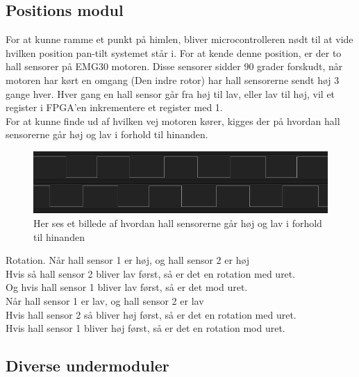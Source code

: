 \subsection{Positions modul}

For at kunne ramme et punkt på himlen, bliver microcontrolleren nødt til at vide hvilken position pan-tilt systemet står i.
For at kende denne position, er der to hall sensorer på EMG30 motoren.
Disse sensorer sidder 90 grader forskudt, når motoren har kørt en omgang (Den indre rotor) har hall sensorerne sendt høj 3 gange hver.
Hver gang en hall sensor går fra høj til lav, eller lav til høj, vil et register i FPGA'en inkrementere et register med 1.\\

For at kunne finde ud af hvilken vej motoren kører, kigges der på hvordan hall sensorerne går høj og lav i forhold til hinanden.

\begin{figure}[ht]
	\begin{center}
		\includegraphics[scale=0.5]{Billeder/Hall_sensorer.png}
	\end{center}
\label{fig:Hall_Sensorer}
\caption{Her ses et billede af hvordan hall sensorerne går høj og lav i forhold til hinanden}
\end{figure}

Rotation.
Når hall sensor 1 er høj, og hall sensor 2 er høj\\
Hvis så hall sensor 2 bliver lav først, så er det en rotation med uret.\\
Og hvis hall sensor 1 bliver lav først, så er det mod uret.\\

Når hall sensor 1 er lav, og hall sensor 2 er lav\\
Hvis hall sensor 2 så bliver høj først, så er det en rotation med uret.\\
Hvis hall sensor 1 bliver høj først, så er det en rotation mod uret.\\

\subsection{Diverse undermoduler}

